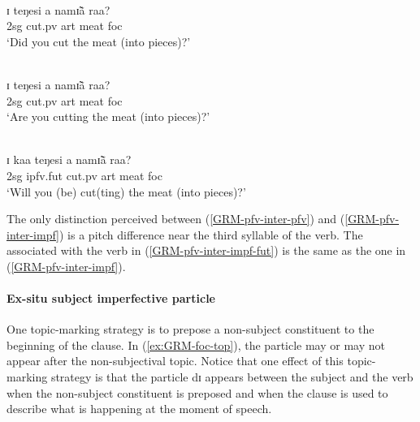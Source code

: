 \begin{exe}
\begin{exe}
\begin{exe}
\begin{exe}
\begin{exe}
\begin{exe}
\begin{exe}
\begin{exe}
\begin{exe}
\begin{exe}
\begin{exe}
\ea\label{GRM-pfv-inter-pfv}
\glll {\Ttwo} {\Tnine \Tnine \Tnine} {\Tthree} {\Tthree \Tthree} {\Tone\Tone}\\
 ɪ   teŋesi  a  namɪ̃ã  raa?\\
    {\sc 2sg} {cut.{\sc pv}} {\sc art} {meat} {\sc foc}\\
\glt `Did you cut the meat (into pieces)?'\\



\ex\label{GRM-pfv-inter-impf}

\glll {\Ttwo} {\Tnine \Tnine \Tfour} {\Tthree} {\Tthree \Tthree} {\Tone\Tone}\\
ɪ   teŋesi  a  namɪ̃ã  raa?\\
    {\sc 2sg} {cut.{\sc pv}} {\sc art} {meat} {\sc foc}\\
\glt `Are you cutting the meat (into pieces)?'\\


\ex\label{GRM-pfv-inter-impf-fut}


\glll {\Ttwo} {\Tfive \Teight} {\Tseven \Tseven \Tthree} {\Tthree} {\Tthree \Tthree} {\Tone \Tone}\\
ɪ  kaa teŋesi  a  namɪ̃ã  raa?\\
    {\sc 2sg} {\sc ipfv.fut} {cut.{\sc pv}} {\sc art} {meat} {\sc foc}\\
\glt  `Will you (be) cut(ting) the meat (into pieces)?'\\
\z 
 \z

The only distinction perceived between (\ref{GRM-pfv-inter-pfv})  and (\ref{GRM-pfv-inter-impf}) is a pitch difference near the third syllable of the verb. The  associated with the verb in (\ref{GRM-pfv-inter-impf-fut}) is the same as the one in (\ref{GRM-pfv-inter-impf}).


\paragraph{Ex-situ subject imperfective particle}
\label{sec:GRM-ipfv-part}

One topic-marking strategy is to prepose a non-subject constituent to the beginning of the clause.  In  (\ref{ex:GRM-foc-top}),  the  particle may or may not appear after the non-subjectival topic. Notice that one effect of this topic-marking strategy is that the particle {\sls dɪ} appears between the subject and the verb when the non-subject constituent is preposed and when the clause is used to describe what is happening at the moment of speech. \nolinebreak


\end{exe}
\end{exe}
\end{exe}
\end{exe}
\end{exe}
\end{exe}
\end{exe}
\end{exe}
\end{exe}
\end{exe}
\end{exe}
